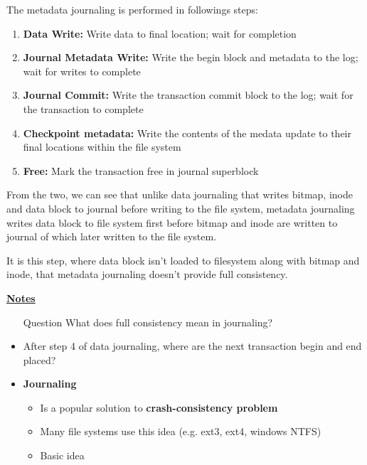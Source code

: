 \documentclass[12pt]{article}
\begin{document}
\begin{enumerate}[1.]
\begin{enumerate}[a)]
        \bigskip

        The metadata journaling is performed in followings steps:

        \bigskip

        \begin{enumerate}[1.]
            \item \textbf{Data Write:} Write data to final location; wait for completion
            \item \textbf{Journal Metadata Write:} Write the begin block and metadata to the log; wait for writes to complete
            \item \textbf{Journal Commit:} Write the transaction commit block to the log; wait for the transaction to complete
            \item \textbf{Checkpoint metadata:} Write the contents of the medata update to their
            final locations within the file system
            \item \textbf{Free:} Mark the transaction free in journal superblock
        \end{enumerate}

        \bigskip

        From the two, we can see that unlike data journaling that writes bitmap, inode and data block
        to journal before writing to the file system, metadata journaling writes data block to file system
        first before bitmap and inode are written to journal of which later written to the file system.

        \bigskip

        It is this step, where data block isn't loaded to filesystem along with bitmap and inode,
        that metadata journaling doesn't provide full consistency.

        \bigskip

        \underline{\textbf{Notes}}

        \begin{itemize}
            \item [\color{blue}Question\color{black}] What does full consistency mean in journaling?
            \item After step 4 of data journaling, where are the next transaction begin and end placed?
            \item \textbf{Journaling}
            \begin{itemize}
                \item Is a popular solution to \textbf{crash-consistency problem}
                \item Many file systems use this idea (e.g. ext3, ext4, windows NTFS)
                \item Basic idea


\end{itemize}
\end{itemize}
\end{enumerate}
\end{enumerate}
\end{document}
